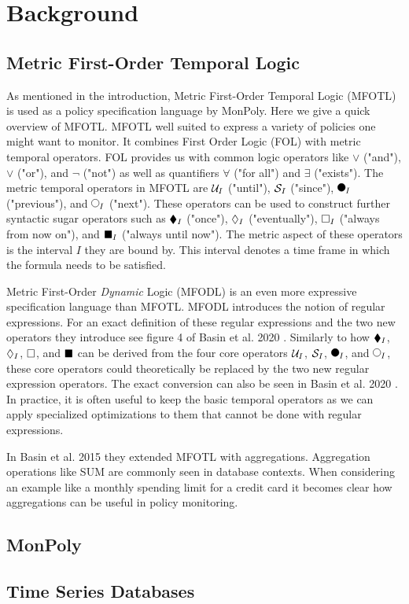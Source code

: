 \section{Background}

\subsection{Metric First-Order Temporal Logic}
As mentioned in the introduction, Metric First-Order Temporal Logic (MFOTL) \cite{Basin2008, Basin2015, Chomicki1995} is used as a policy specification language by MonPoly.
Here we give a quick overview of MFOTL.
MFOTL well suited to express a variety of policies one might want to monitor.
It combines First Order Logic (FOL) with metric temporal operators.
FOL provides us with common logic operators like $\vee$ ("and"), $\lor$ ("or"), and $\neg$ ("not") as well as quantifiers $\forall$ ("for all") and $\exists$ ("exists").
The metric temporal operators in MFOTL are $\mathcal{U}_I$ ("until"), $\mathcal{S}_I$ ("since"), $\Previous_I$ ("previous"), and $\Next_I$ ("next").
These operators can be used to construct further syntactic sugar operators such as $\blacklozenge_I$ ("once"), $\lozenge_I$ ("eventually"), $\square_I$ ("always from now on"), and $\blacksquare_I$ ("always until now").
The metric aspect of these operators is the interval $I$ they are bound by.
This interval denotes a time frame in which the formula needs to be satisfied.

Metric First-Order \textit{Dynamic} Logic (MFODL) \cite{Basin2020} is an even more expressive specification language than MFOTL.
MFODL introduces the notion of regular expressions.
For an exact definition of these regular expressions and the two new operators they introduce see figure 4 of Basin et al. 2020 \cite{Basin2020}.
Similarly to how $\blacklozenge_I$, $\lozenge_I$, $\square$, and $\blacksquare$ can be derived from the four core operators $\mathcal{U}_I$, $\mathcal{S}_I$, $\Previous_I$, and $\Next_I$, these core operators could theoretically be replaced by the two new regular expression operators.
The exact conversion can also be seen in Basin et al. 2020 \cite{Basin2020}.
In practice, it is often useful to keep the basic temporal operators as we can apply specialized optimizations to them that cannot be done with regular expressions.

In Basin et al. 2015 \cite{Basin2015aggregations} they extended MFOTL with aggregations.
Aggregation operations like SUM are commonly seen in database contexts.
When considering an example like a monthly spending limit for a credit card it becomes clear how aggregations can be useful in policy monitoring.


\subsection{MonPoly}


\subsection{Time Series Databases}